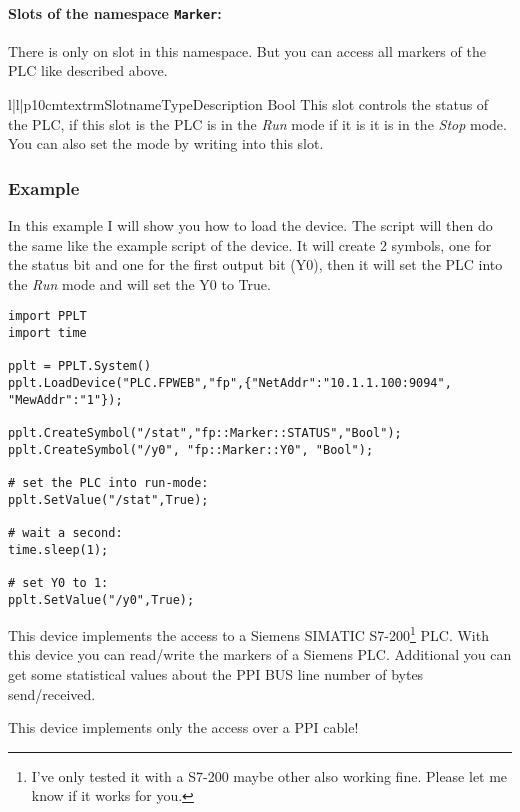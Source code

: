 \paragraph{Slots of the namespace \texttt{Marker}:}
There is only on slot in this namespace. But you can access all markers 
of the PLC like described above.
\begin{tableiii}{l|l|p{10cm}}{textrm}{Slotname}{Type}{Description}
        {Bool}
        {This slot controls the status of the PLC, if this slot is 
         the PLC is in the \emph{Run} mode if it is
         it is in the \emph{Stop} mode. You can also
        set the mode by writing into this slot.}
\end{tableiii}

\subsubsection{Example}
In this example I will show you how to load the  device.
The script will then do the same like the example script of the 
 device. It will create 2 symbols, one for
the status bit and one for the first output bit (Y0), then it will
set the PLC into the \emph{Run} mode and will set the Y0 to True.

\begin{verbatim}
import PPLT
import time

pplt = PPLT.System()
pplt.LoadDevice("PLC.FPWEB","fp",{"NetAddr":"10.1.1.100:9094", "MewAddr":"1"});

pplt.CreateSymbol("/stat","fp::Marker::STATUS","Bool");
pplt.CreateSymbol("/y0", "fp::Marker::Y0", "Bool");

# set the PLC into run-mode:
pplt.SetValue("/stat",True);

# wait a second:
time.sleep(1);

# set Y0 to 1:
pplt.SetValue("/y0",True);
\end{verbatim}






This device implements the access to a Siemens SIMATIC 
S7-200\footnote{I've only tested it with a S7-200 maybe other also working 
fine. Please let me know if it works for you.} PLC. With this device you can 
read/write the markers of a Siemens PLC. Additional you can get some 
statistical values about the PPI BUS line number of bytes send/received.
\begin{notice}
This device implements only the access over a PPI cable!
\end{notice}


